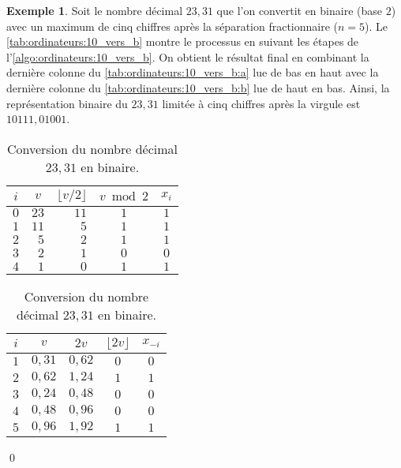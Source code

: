 \documentclass[letterpaper,11pt,english,french]{memoir}
\theoremstyle{plain}
\theoremstyle{definition}
\newtheorem{exemple}{Exemple}[chapter]
\theoremstyle{remark}
\begin{document}
\begin{exemple}
  \label{ex:ordinateurs:10_vers_b}
  Soit le nombre décimal $23,31$ que l'on convertit en binaire (base
  $2$) avec un maximum de cinq chiffres après la séparation
  fractionnaire ($n = 5$). Le \autoref{tab:ordinateurs:10_vers_b}
  montre le processus en suivant les étapes de
  l'\autoref{algo:ordinateurs:10_vers_b}. On obtient le
  résultat final en combinant la dernière colonne du
  \autoref{tab:ordinateurs:10_vers_b:a} lue de bas en haut avec la
  dernière colonne du \autoref{tab:ordinateurs:10_vers_b:b} lue de
  haut en bas. Ainsi, la représentation binaire du $23,31$ limitée à
  cinq chiffres après la virgule est $10111,01001$.

  \begin{table}
    \caption{Conversion du nombre décimal $23,31$ en binaire.}
    \label{tab:ordinateurs:10_vers_b}
    \begin{minipage}[t]{0.45\linewidth}
      \label{tab:ordinateurs:10_vers_b:a}
      \begin{tabular*}{\linewidth}{crrcc}
        \toprule
        $i$ & \multicolumn{1}{c}{$v$} & $\lfloor v/2 \rfloor$ & $v \bmod 2$ & $x_i$ \\
        \midrule
        $0$ & $23$ & $11$ & $1$ & $1$ \\
        $1$ & $11$ &  $5$ & $1$ & $1$ \\
        $2$ &  $5$ &  $2$ & $1$ & $1$ \\
        $3$ &  $2$ &  $1$ & $0$ & $0$ \\
        $4$ &  $1$ &  $0$ & $1$ & $1$ \\
        \bottomrule
      \end{tabular*}
    \end{minipage}
    \hfill
    \begin{minipage}[t]{0.45\linewidth}
      \label{tab:ordinateurs:10_vers_b:b}
      \begin{tabular*}{\linewidth}{ccccc}
        \toprule
        $i$ & $v$ & $2v$ & $\lfloor 2v \rfloor$ & $x_{-i}$ \\
        \midrule
        $1$ & $0,31$ & $0,62$ & $0$ & $0$ \\
        $2$ & $0,62$ & $1,24$ & $1$ & $1$ \\
        $3$ & $0,24$ & $0,48$ & $0$ & $0$ \\
        $4$ & $0,48$ & $0,96$ & $0$ & $0$ \\
        $5$ & $0,96$ & $1,92$ & $1$ & $1$ \\
        \bottomrule
      \end{tabular*}
    \end{minipage}
  \end{table}
  \qed
\end{exemple}
\end{document}
